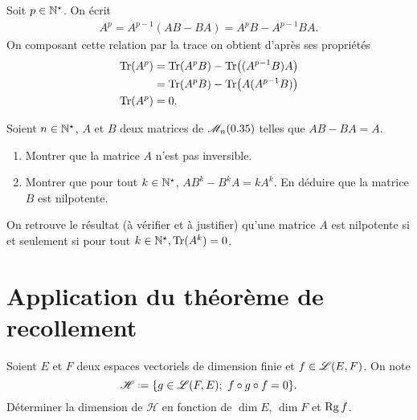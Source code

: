
\begin{solution}
    Soit $p \in \mathbb{N}^\star$. On écrit
    \begin{align*}
        A^p = A^{p-1}(AB-BA) = A^pB - A^{p-1}BA.
    \end{align*}
    On composant cette relation par la trace on obtient d'après ses propriétés
    \begin{align*}
        \mathrm{Tr}(A^p) &= \mathrm{Tr}(A^pB) - \mathrm{Tr} \big((A^{p-1}B)A \big) \\
        &= \mathrm{Tr}(A^pB) - \mathrm{Tr} \big(A(A^{p-1}B) \big) \\
        \mathrm{Tr}(A^p) &= 0.
    \end{align*}
\end{solution}

\begin{exercice} 
    Soient $n \in \mathbb{N}^\star$, $A$ et $B$ deux matrices de $\mathscr{M}_n(0.35)$ telles que $AB - BA = A.$
    \begin{enumerate}
        \item Montrer que la matrice $A$ n'est pas inversible.
        \item Montrer que pour tout $k \in \mathbb{N}^\star$, $AB^k - B^k A = k A^k$. En déduire que la matrice $B$ est nilpotente. 
    \end{enumerate}
\end{exercice}

\begin{remarque}
    On retrouve le résultat (à vérifier et à justifier) qu'une matrice $A$ est nilpotente si et seulement si pour tout $k \in \mathbb{N}^\star, \mathrm{Tr}(A^k) = 0$.
\end{remarque}


\section{Application du théorème de recollement}

\begin{exercice}
    Soient $E$ et $F$ deux espaces vectoriels de dimension finie et $f \in \mathscr{L}(E, F)$. On note 
    $$\mathscr{H} \defeq \{ g \in \Endo(F, E);\ f \circ g \circ f = 0\}.$$ 
    Déterminer la dimension de $\mathscr{H}$ en fonction de $\dim E$, $\dim F$ et $\mathrm{Rg}\, f$.
\end{exercice}


